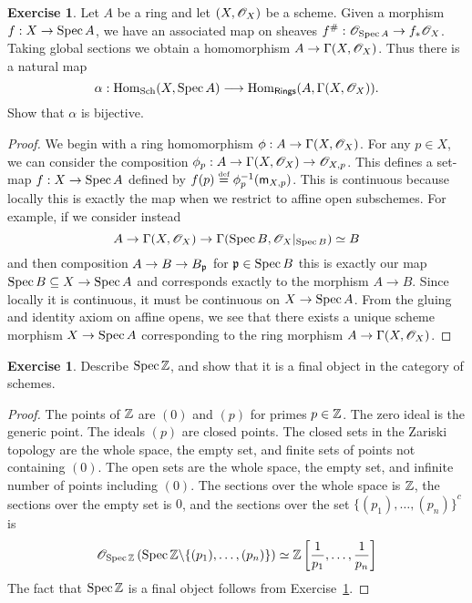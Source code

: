 \documentclass[]{pcmi}
\theoremstyle{plain}
\theoremstyle{definition}
\newtheorem{Exercise}[equation]{Exercise}
\theoremstyle{remark}
\begin{document}
\begin{Exercise}\label{Exercise:2.2.4}
    Let $A$ be a ring and let $(X, \mathscr{O}_X)$ be a scheme. Given a morphism $f : X \to \operatorname{Spec} A$, we have an associated map on sheaves $f^\# : \mathscr{O}_{\operatorname{Spec} A} \to f_* \mathscr{O}_X$. Taking global sections we obtain a homomorphism $A \to \Gamma(X, \mathscr{O}_X)$. Thus there is a natural map 
    \[
        \alpha : \operatorname{Hom}_{\operatorname{Sch}}(X, \operatorname{Spec} A) \longrightarrow \operatorname{Hom}_{\mathsf{Rings}}(A, \Gamma(X, \mathscr{O}_X)).
    \]
    Show that $\alpha$ is bijective. 
\end{Exercise}

\begin{proof}
    We begin with a ring homomorphism $\phi : A \to \Gamma(X, \mathscr{O}_X)$. For any $p \in X$, we can consider the composition $\phi_p : A \to \Gamma(X, \mathscr{O}_X) \to \mathscr{O}_{X, p}$. This defines a set-map $f : X \to \operatorname{Spec} A$ defined by $f(p) \overset{\textup{\tiny def}}= \phi_p^{-1}(\mathsf{m}_{X, p})$. This is continuous because locally this is exactly the map when we restrict to affine open subschemes. For example, if we consider instead 
    \[
        A \to \Gamma(X, \mathscr{O}_X) \to \Gamma(\operatorname{Spec} B, \mathscr{O}_X|_{\operatorname{Spec} B}) \simeq B
    \]
    and then composition $A \to B \to B_{\mathfrak{p}}$ for $\mathfrak{p} \in \operatorname{Spec} B$ this is exactly our map $\operatorname{Spec} B \subseteq X \to \operatorname{Spec} A$ and corresponds exactly to the morphism $A \to B$. Since locally it is continuous, it must be continuous on $X \to \operatorname{Spec} A$. From the gluing and identity axiom on affine opens, we see that there exists a unique scheme morphism $X \to \operatorname{Spec} A$ corresponding to the ring morphism $A \to \Gamma(X, \mathscr{O}_X)$. 
\end{proof}

\begin{Exercise}
    Describe $\operatorname{Spec} \mathbb{Z}$, and show that it is a final object in the category of schemes. 
\end{Exercise}

\begin{proof}
    The points of $\mathbb{Z}$ are $(0)$ and $(p)$ for primes $p \in \mathbb{Z}$. The zero ideal is the generic point. The ideals $(p)$ are closed points. The closed sets in the Zariski topology are the whole space, the empty set, and finite sets of points not containing $(0)$. The open sets are the whole space, the empty set, and infinite number of points including $(0)$. The sections over the whole space is $\mathbb{Z}$, the sections over the empty set is $0$, and the sections over the set ${\{(p_1), \ldots, (p_n)\}}^c$ is 
    \[
        \mathscr{O}_{\operatorname{Spec} \mathbb{Z}} \left( \operatorname{Spec} \mathbb{Z} \backslash \{(p_1), \ldots, (p_n) \} \right) \simeq \mathbb{Z} \left[ \frac{1}{p_1}, \ldots, \frac{1}{p_n} \right]
    \]
    The fact that $\operatorname{Spec} \mathbb{Z}$ is a final object follows from Exercise~\ref{Exercise:2.2.4}. 
\end{proof}
\end{document}

